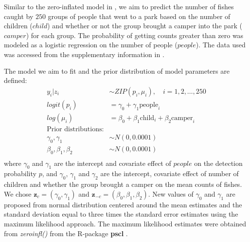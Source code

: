\documentclass[
]{article}
\begin{document}
Similar to the zero-inflated model in \citet{berild2022importance}, we
aim to predict the number of fishes caught by \(250\) groups of people
that went to a park based on the number of children (\(child\)) and
whether or not the group brought a camper into the park (\(camper\)) for
each group. The probability of getting counts greater than zero was
modeled as a logistic regression on the number of people (\(people\)).
The data used was accessed from the supplementary information in
\cite{berild2022importance}.

The model we aim to fit and the prior distribution of model parameters
are defined: \begin{equation}
\begin{split}
y_i | z_i &\sim ZIP(p_i, \mu_i), \quad i = 1, 2, \ldots, 250 \\
logit(p_i) &= \gamma_0 + \gamma_1 \text{people}_i \\
log(\mu_i) &= \beta_0 + \beta_1 \text{child}_i + \beta_2 \text{camper}_i \\
\text{Prior distributions:}\\
\gamma_0, \gamma_1 &\sim N(0, 0.0001) \\
\beta_0, \beta_1, \beta_2 &\sim N(0, 0.0001)\\
\end{split}
\end{equation} where \(\gamma_0\) and \(\gamma_1\) are the intercept and
covariate effect of \(people\) on the detection probability \(p\), and
\(\gamma_0\), \(\gamma_1\) and \(\gamma_2\) are the intercept, covariate
effect of number of children and whether the group brought a camper on
the mean counts of fishes. We chose
\(\mathbf{z}_{c} = (\gamma_0, \gamma_1)\) and
\(\mathbf{z}_{-c} = (\beta_0, \beta_1, \beta_2)\). New values of
\(\gamma_0\) and \(\gamma_1\) are proposed from normal distribution
centered around the mean estimates and the standard deviation equal to
three times the standard error estimates using the maximum likelihood
approach. The maximum likelihood estimates were obtained from
\textit{zeroinfl()} from the R-package \textbf{pscl} \citep{pscl}.
\end{document}
